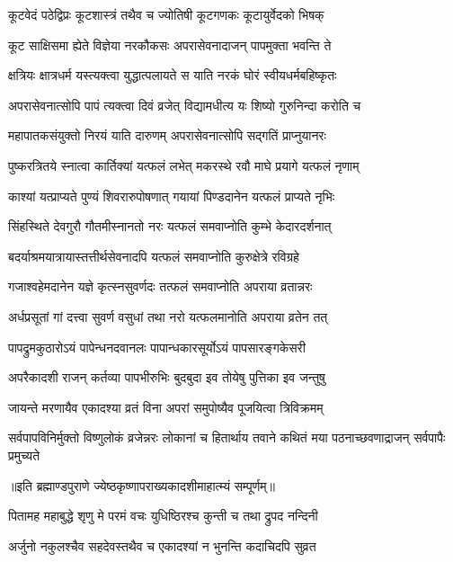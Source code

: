 \twolineshloka
{कूटवेदं पठेद्विप्रः कूटशास्त्रं तथैव च}
{ज्योतिषी कूटगणकः कूटायुर्वेदको भिषक्} %

\twolineshloka
{कूट साक्षिसमा ह्येते विज्ञेया नरकौकसः}
{अपरासेवनादाजन् पापमुक्ता भवन्ति ते} %

\twolineshloka
{क्षत्रियः क्षात्रधर्म यस्त्यक्त्वा युद्धात्पलायते}
{स याति नरकं घोरं स्वीयधर्मबहिष्कृतः} %

\twolineshloka
{अपरासेवनात्सोपि पापं त्यक्त्वा दिवं व्रजेत्}
{विद्यामधीत्य यः शिष्यो गुरुनिन्दा करोति च} %

\twolineshloka
{महापातकसंयुक्तो निरयं याति दारुणम्}
{अपरासेवनात्सोपि सद्गतिं प्राप्नुयानरः} %

\twolineshloka
{पुष्करत्रितये स्नात्वा कार्तिक्यां यत्फलं लभेत्}
{मकरस्थे रवौ माघे प्रयागे यत्फलं नृणाम्} %

\twolineshloka
{काश्यां यत्प्राप्यते पुण्यं शिवरारुपोषणात्}
{गयायां पिण्डदानेन यत्फलं प्राप्यते नृभिः} %

\twolineshloka
{सिंहस्थिते देवगुरौ गौतमीस्नानतो नरः}
{यत्फलं समवाप्नोति कुम्भे केदारदर्शनात्} %

\twolineshloka
{बदर्याश्रमयात्रायास्तत्तीर्थसेवनादपि}
{यत्फलं समवाप्नोति कुरुक्षेत्रे रविग्रहे} %

\twolineshloka
{गजाश्वहेमदानेन यज्ञे कृत्स्नसुवर्णदः}
{तत्फलं समवाप्नोति अपराया व्रतान्नरः} %

\twolineshloka
{अर्धप्रसूतां गां दत्त्वा सुवर्ण वसुधां तथा}
{नरो यत्फलमानोति अपराया व्रतेन तत्} %

\twolineshloka
{पापद्रुमकुठारोऽयं पापेन्धनदवानलः}
{पापान्धकारसूर्योऽयं पापसारङ्गकेसरी} %

\twolineshloka
{अपरैकादशी राजन् कर्तव्या पापभीरुभिः}
{बुदबुदा इव तोयेषु पुत्तिका इव जन्तुषु} %

\twolineshloka
{जायन्ते मरणायैव एकादश्या व्रतं विना}
{अपरां समुपोष्यैव पूजयित्वा त्रिविक्रमम्} %


\threelineshloka
{सर्वपापविनिर्मुक्तो विष्णुलोकं व्रजेन्नरः}
{लोकानां च हितार्थाय तवाने कथितं मया}
{पठनाच्छवणाद्राजन् सर्वपापैः प्रमुच्यते} %

॥इति ब्रह्माण्डपुराणे ज्येष्ठकृष्णापराख्यकादशीमाहात्म्यं सम्पूर्णम्॥



\twolineshloka
{पितामह महाबुद्धे शृणु मे परमं वचः}
{युधिष्ठिरश्च कुन्ती च तथा द्रुपद नन्दिनी} %

\twolineshloka
{अर्जुनो नकुलश्चैव सहदेवस्तथैव च}
{एकादश्यां न भुनन्ति कदाचिदपि सुव्रत} %


